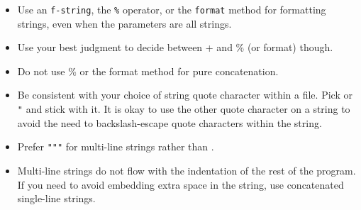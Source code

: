 \documentclass[
]{book}
\newenvironment{Shaded}{\begin{snugshade}}{\end{snugshade}}
\newcommand{\BuiltInTok}[1]{#1}
\newcommand{\CommentTok}[1]{\textcolor[rgb]{0.56,0.35,0.01}{\textit{#1}}}
\newcommand{\NormalTok}[1]{#1}
\newcommand{\OperatorTok}[1]{\textcolor[rgb]{0.81,0.36,0.00}{\textbf{#1}}}
\newcommand{\SpecialCharTok}[1]{\textcolor[rgb]{0.00,0.00,0.00}{#1}}
\newcommand{\SpecialStringTok}[1]{\textcolor[rgb]{0.31,0.60,0.02}{#1}}
\newcommand{\StringTok}[1]{\textcolor[rgb]{0.31,0.60,0.02}{#1}}
\begin{document}
\begin{itemize}
\item
  Use an \texttt{f-string}, the \texttt{\%} operator, or the \texttt{format} method for formatting
  strings, even when the parameters are all strings.
\item
  Use your best judgment to decide between + and \% (or format) though.
\item
  Do not use \% or the format method for pure concatenation.

\begin{Shaded}
\end{Shaded}
\item
  Be consistent with your choice of string quote character within a file.
  Pick \texttt{\textquotesingle{}} or \texttt{"} and stick with it. It is okay to use the other quote
  character on a string to avoid the need to backslash-escape quote characters
  within the string.
\item
  Prefer \texttt{"""} for multi-line strings rather than \texttt{\textquotesingle{}\textquotesingle{}\textquotesingle{}}.
\item
  Multi-line strings do not flow with the indentation of the rest of the program.
  If you need to avoid embedding extra space in the string, use concatenated
  single-line strings.


\end{itemize}
\end{document}
